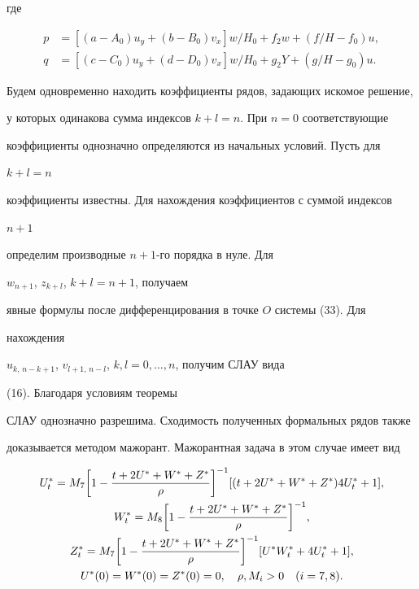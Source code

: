где


\begin{align*}


p&=[(a-A_0)u_y+(b-B_0)v_x]w/H_0+f_2w+(f/H-f_0)u,\\


q&=[(c-C_0)u_y+(d-D_0)v_x]w/H_0+g_2Y+(g/H-g_0)u.


\end{align*}





Будем одновременно находить коэффициенты рядов, задающих искомое решение,


у которых одинакова сумма индексов $k+l=n$. При $n=0$ соответствующие


коэффициенты однозначно определяются из начальных условий. Пусть для


$k+l=n$


коэффициенты известны. Для нахождения коэффициентов с суммой индексов


$n+1$


определим производные $n{+}1$-го порядка в нуле. Для


$w_{n+1}$, $z_{k+l}$, $k+l=n+1$, получаем


явные формулы после дифференцирования в точке $O$ системы (33). Для


нахождения


$u_{k,\,n-k+1}$, $v_{l+1,\,n-l}$, $k,l=0,\dotsc,n$, получим СЛАУ вида


(16). Благодаря условиям теоремы


СЛАУ однозначно разрешима. Сходимость полученных формальных рядов также


доказывается методом мажорант. Мажорантная задача в этом случае имеет вид


\begin{gather}


U^*_t=M_7\biggl[1-\frac{t+2U^*+W^*+Z^*}{\rho}\biggr]^{-1}


[(t+2U^*+W^*+Z^*)4U^*_t+1],\notag\\


W^*_t=M_8\biggl[1-\frac{t+2U^*+W^*+Z^*}{\rho}\biggr]^{-1},\\


Z^*_t=M_7\biggl[1-\frac{t+2U^*+W^*+Z^*}{\rho}\biggr]^{-1}


[U^*W^*_t+4U^*_t+1],\notag\\


U^*(0)=W^*(0)=Z^*(0)=0,\quad \rho,M_i>0\quad (i=7,8).\notag


\end{gather}


